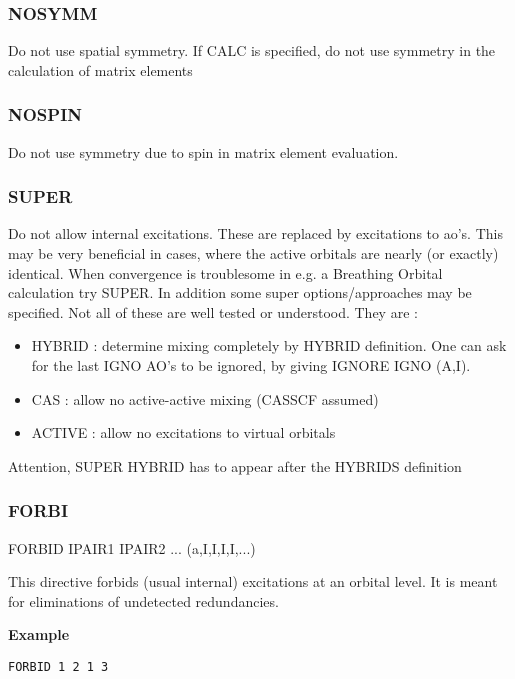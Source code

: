 \documentclass[11pt,fleqn]{article}
\begin{document}
\subsubsection{NOSYMM}

Do not use spatial symmetry. If CALC is specified, do not use
symmetry in the calculation of matrix elements

\subsubsection{NOSPIN}

Do not use symmetry due to spin in matrix element evaluation. 

\subsubsection{SUPER}

Do not allow internal excitations. These are replaced by excitations
to ao's. This may be very beneficial in cases, where the active
orbitals are nearly (or exactly) identical. When convergence is
troublesome in e.g. a Breathing Orbital \cite{ref:vb7} calculation
try SUPER.
In addition some super options/approaches may be specified.
Not all of these are well tested or understood. They are :
\begin{itemize}
\item HYBRID : determine mixing completely by HYBRID definition. One
can ask for the last IGNO AO's to be ignored, by giving IGNORE IGNO (A,I).
\item CAS    : allow no active-active mixing (CASSCF assumed)
\item ACTIVE : allow no excitations to virtual orbitals
\end{itemize} 

Attention, SUPER HYBRID has to appear after the HYBRIDS definition

\subsubsection{FORBI}

FORBID IPAIR1 IPAIR2 ... (a,I,I,I,I,...)

This directive forbids (usual internal) excitations at an orbital level.
It is meant for eliminations of undetected redundancies.

{\bf Example}
\begin{verbatim}
FORBID 1 2 1 3
\end{verbatim}
\end{document}
